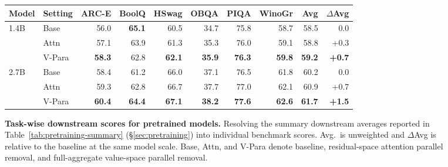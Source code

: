 \begin{figure}[!t]
  \captionsetup{type=table}
  \caption{\textbf{Task-wise downstream scores for pretrained models.}
  Resolving the summary downstream averages reported in Table~\ref{tab:pretraining-summary} (\S\ref{sec:pretraining}) into individual benchmark scores. Avg.\ is unweighted and \(\Delta\)Avg is relative to the baseline at the same model scale. Base,
  Attn, and V-Para denote baseline, residual-space attention parallel removal,
  and full-aggregate value-space parallel removal.}
  \label{tab:appendix-pretraining-downstream}
  \centering
  \small
  \setlength{\tabcolsep}{4pt}
  \begin{tabular}{@{}llrrrrrrrr@{}}
    \toprule
    Model & Setting & ARC-E & BoolQ & HSwag & OBQA & PIQA & WinoGr & Avg & $\Delta$Avg \\
    \midrule
    \multirow{3}{*}{1.4B}
      & Base & 56.0 & \textbf{65.1} & 60.5 & 34.7 & 75.8 & 58.7 & 58.5 & 0.0 \\
      & Attn & 57.1 & 63.9 & 61.3 & 35.3 & 76.0 & 59.1 & 58.8 & +0.3 \\
      & V-Para & \textbf{58.3} & 62.8 & \textbf{62.1} & \textbf{35.9} & \textbf{76.3} & \textbf{59.8} & \textbf{59.2} & \textbf{+0.7} \\
    \midrule
    \multirow{3}{*}{2.7B}
      & Base & 58.4 & 61.2 & 66.0 & 37.1 & 76.5 & 61.8 & 60.2 & 0.0 \\
      & Attn & 59.3 & 62.8 & 66.7 & 37.7 & 77.0 & 62.1 & 60.9 & +0.7 \\
      & V-Para & \textbf{60.4} & \textbf{64.4} & \textbf{67.1} & \textbf{38.2} & \textbf{77.6} & \textbf{62.6} & \textbf{61.7} & \textbf{+1.5} \\
    \bottomrule
  \end{tabular}

  \vspace{1.5em}


\end{figure}
